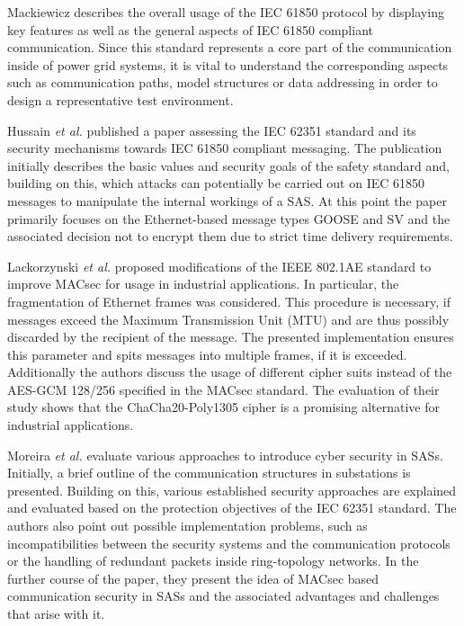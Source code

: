 \documentclass[conference, onecolumn, a4paper]{IEEEtran}
\begin{document}
\smallskip
Mackiewicz \cite{IEC61850_Overview:2006} describes the overall usage of the IEC 61850 protocol by displaying key features as well as the general aspects 
of IEC 61850 compliant communication. Since this standard represents a core part of the communication inside of power grid systems, it is vital to 
understand the corresponding aspects such as communication paths, model structures or data addressing in order to design a representative test environment. 

\smallskip
Hussain  \textit{et al.} \cite{Review_IEC62351:2019} published a paper assessing the IEC 62351 standard and its security mechanisms towards IEC 61850 
compliant messaging. The publication initially describes the basic values and security goals of the safety standard and, building on this, which attacks 
can potentially be carried out on IEC 61850 messages to manipulate the internal workings of a SAS. At this point the paper primarily focuses on the 
Ethernet-based message types GOOSE and SV and the associated decision not to encrypt them due to strict time delivery requirements.  

\smallskip
Lackorzynski \textit{et al.} \cite{MACsecIndustrialOptimization:2020} proposed modifications of the IEEE 802.1AE standard to improve MACsec for usage 
in industrial applications. In particular, the fragmentation of Ethernet frames was considered. This procedure is necessary, if messages exceed the 
Maximum Transmission Unit (MTU) and are thus possibly discarded by the recipient of the message. The presented implementation ensures this parameter 
and spits messages into multiple frames, if it is exceeded. Additionally the authors discuss the usage of different cipher suits instead of the 
AES-GCM 128/256 specified in the MACsec standard. The evaluation of their study shows that the ChaCha20-Poly1305 cipher is a promising alternative 
for industrial applications.

\smallskip
Moreira \textit{et al.} \cite{Cybersecurity_Substation:2016} evaluate various approaches to introduce cyber security in SASs. Initially, a brief outline 
of the communication structures in substations is presented. Building on this, various established security approaches are explained and evaluated based 
on the protection objectives of the IEC 62351 standard. The authors also point out possible implementation problems, such as incompatibilities between 
the security systems and the communication protocols or the handling of redundant packets inside ring-topology networks. In the further course of the 
paper, they present the idea of MACsec based communication security in SASs and the associated advantages and challenges that arise with it. 
\end{document}
